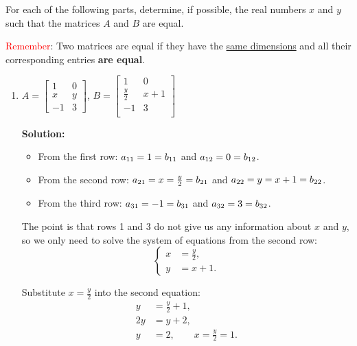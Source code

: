\item For each of the following parts, determine, if possible, the real numbers $x$ and $y$ such that the matrices $A$ and $B$ are equal.

    \textcolor{red}{Remember}: Two matrices are equal if they have the \underline{same dimensions} and all their corresponding entries \textbf{are equal}.

    \begin{enumerate}
        \item
            $A = \begin{bmatrix}
                1 & 0 \\
                x & y \\
                -1 & 3
            \end{bmatrix}$, \quad
            $B = \begin{bmatrix}
                1 & 0 \\    
                \frac{y}{2} & x + 1 \\    
                -1 & 3 \\    
            \end{bmatrix}$
    
    \textbf{Solution:}
    \begin{banswer}
        \begin{itemize}
            \item From the first row: $\mathlarger{a}_{11} = 1 = \mathlarger{b}_{11}$ and $\mathlarger{a}_{12} = 0 = \mathlarger{b}_{12}$.
            \item From the second row: $\mathlarger{a}_{21} = x = \frac{y}{2} = \mathlarger{b}_{21}$ and $\mathlarger{a}_{22} = y = x + 1 = \mathlarger{b}_{22}$.
            \item From the third row: $\mathlarger{a}_{31} = -1 = \mathlarger{b}_{31}$ and $\mathlarger{a}_{32} = 3 = \mathlarger{b}_{32}$.
        \end{itemize}

        The point is that rows 1 and 3 do not give us any information about $x$ and $y$, so we only need to solve the system of equations from the second row:
        $$
        \left\{
        \begin{aligned}
            x &= \frac{y}{2},\\
            y &= x+1.
        \end{aligned}
        \right.
        $$

        Substitute $x=\frac{y}{2}$ into the second equation:
        $$
        \begin{aligned}
            y &= \frac{y}{2}+1,\\
            2y &= y+2,\\
            y &= 2,\qquad x=\frac{y}{2}=1.
        \end{aligned}
        $$


\end{banswer}
\end{enumerate}
